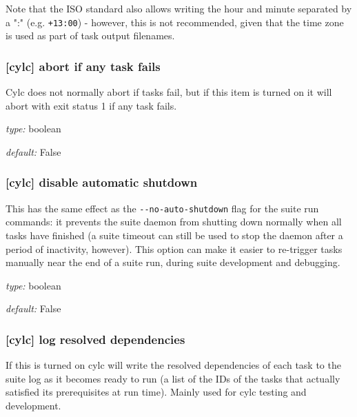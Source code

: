 Note that the ISO standard also allows writing the hour and minute separated
by a ":" (e.g. \lstinline=+13:00=) - however, this is not recommended, given
that the time zone is used as part of task output filenames.

\subsubsection[abort if any task fails]{[cylc] \textrightarrow abort if any task fails}

Cylc does not normally abort if tasks fail, but if this item is turned
on it will abort with exit status 1 if any task fails.

\begin{myitemize}
    \item {\em type:} boolean
    \item {\em default:} False
\end{myitemize}

\subsubsection[disable automatic shutdown]{[cylc] \textrightarrow disable automatic shutdown}

This has the same effect as the \lstinline{--no-auto-shutdown} flag for
the suite run commands: it prevents the suite daemon from shutting down
normally when all tasks have finished (a suite timeout can still be used to
stop the daemon after a period of inactivity, however).  This option can
make it easier to re-trigger tasks manually near the end of a suite run,
during suite development and debugging.

\begin{myitemize}
    \item {\em type:} boolean
    \item {\em default:} False
\end{myitemize}

\subsubsection[log resolved dependencies]{[cylc] \textrightarrow log resolved dependencies}

If this is turned on cylc will write the resolved dependencies of each
task to the suite log as it becomes ready to run (a list of the IDs of
the tasks that actually satisfied its prerequisites at run time). Mainly
used for cylc testing and development.

